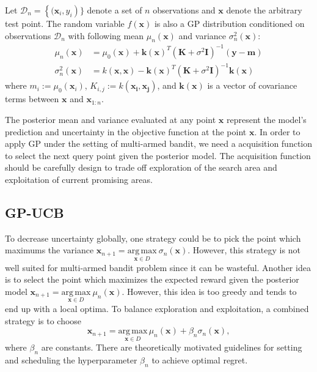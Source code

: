 \documentclass{article}
\begin{document}
Let $\mathcal{D}_n = \left \{( \mathbf{x}_i, y_i \right )\}$ denote a
set of $n$ observations and $\mathbf{x}$ denote the arbitrary test
point. The random variable $f(\mathbf{x})$ is also a GP distribution
conditioned on observations $\mathcal{D}_n$ with following mean
$\mu_n(\mathbf{x})$ and variance $\sigma_n^2(\mathbf{x})$:
\begin{align}
 \mu_n(\mathbf{x}) &= \mu_0(\mathbf{x}) +
                     \mathbf{k}(\mathbf{x})^T(\mathbf{K}+\sigma^2\mathbf{I})^{-1}(\mathbf{y}-\mathbf{m})
  \\
  \sigma_n^2(\mathbf{x}) &= k(\mathbf{x}, \mathbf{x}) -
                           \mathbf{k}(\mathbf{x})^T(\mathbf{K}+\sigma^2\mathbf{I})^{-1}\mathbf{k}(\mathbf{x})
\end{align}
where $m_i := \mu_0(\mathbf{x}_i)$, $K_{i,j} := k(\mathbf{x_i, x_j})$,
and $\mathbf{k}(\mathbf{x})$ is a vector of covariance terms between
$\mathbf{x}$ and $\mathbf{x}_{1:n}$.

The posterior mean and variance evaluated at any point $\mathbf{x}$
represent the model's prediction and uncertainty in the objective
function at the point $\mathbf{x}$. In order to apply GP under the
setting of multi-armed bandit, we need a acquisition function to select
the next query point given the posterior model. The acquisition
function should be carefully design to trade off exploration of the
search area and exploitation of current promising areas.

\subsection{GP-UCB}
To decrease uncertainty globally, one strategy could be to pick the
point which maximums the variance $\mathbf{x}_{n+1}=
\underset{\mathbf{x} \in
  D}{\mathrm{arg\,max}}~\sigma_n(\mathbf{x})$. However, this strategy
is not well suited for multi-armed bandit problem since it can be
wasteful. Another idea is to
select the point which maximizes the expected reward given the
posterior model $\mathbf{x}_{n+1}=
\underset{\mathbf{x} \in
  D}{\mathrm{arg\,max}}~\mu_n(\mathbf{x})$. However, this idea is too
greedy and tends to end up with a local optima. To balance exploration
and exploitation, a combined strategy is to choose
\begin{equation}
  \mathbf{x}_{n+1} = \underset{\mathbf{x} \in D}{\mathrm{arg \,
      max}}\,\mu_n(\mathbf{x})+\beta_n \sigma_n(\mathbf{x}),
\end{equation} \label{eq:gp-ucb-query}
where $\beta_n$ are constants. There are theoretically motivated
guidelines for setting and scheduling the hyperparameter $\beta_n$ to
achieve optimal regret.
\end{document}

